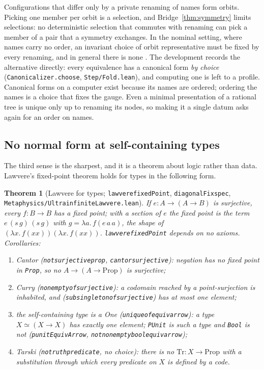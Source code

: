 \documentclass[]{article}
\newtheorem{theorem}{Theorem}
\theoremstyle{definition}
\theoremstyle{remark}
\newcommand{\codeus}{\textunderscore\allowbreak}
\newcommand{\code}[1]{\texttt{\let\_\codeus #1}}
\newcommand{\lpath}[1]{{\ttfamily\nolinkurl{#1}}}
\newcommand{\meta}[1]{\lpath{Metaphysics/#1.lean}}
\newcommand{\step}[1]{\lpath{Step/#1.lean}}
\begin{document}
Configurations that differ only by a private renaming of names form orbits. Picking one member per
orbit is a selection, and Bridge~\ref{thm:symmetry} limits selections: no deterministic selection
that commutes with renaming can pick a member of a pair that a symmetry exchanges. In the nominal
setting, where names carry no order, an invariant choice of orbit representative must be fixed by
every renaming, and in general there is none \cite{Pitts2013}. The development records the
alternative directly: every equivalence has a canonical form \emph{by choice}
(\code{Canonicalizer.choose}, \step{Fold}), and computing one is left to a profile. Canonical forms on
a computer exist because its names are ordered; ordering the names is a choice that fixes the gauge.
Even a minimal presentation of a rational tree is unique only up to renaming its nodes, so making it a
single datum asks again for an order on names.

\subsection{No normal form at self-containing types}
\label{sec:nf-types}

The third sense is the sharpest, and it is a theorem about logic rather than data. Lawvere's
fixed-point theorem \cite{Lawvere1969, Yanofsky2003} holds for types in the following form.

\begin{theorem}[Lawvere for types; \code{lawvere\_fixedPoint}, \code{diagonalFix\_spec}, \meta{UltrainfiniteLawvere}]
\label{thm:lawvere}
If $e:A\to(A\to B)$ is surjective, every $f:B\to B$ has a fixed point; with a section of $e$ the fixed
point is the term $e\,(s\,g)\,(s\,g)$ with $g=\lambda a.\,f(e\,a\,a)$, the shape of
$(\lambda x.\,f(xx))(\lambda x.\,f(xx))$. \code{lawvere\_fixedPoint} depends on no axioms. Corollaries:
\begin{enumerate}
\item \emph{Cantor} (\code{not\_surjective\_prop}, \code{cantor\_surjective}): negation has no fixed
  point in \code{Prop}, so no $A\to(A\to\mathrm{Prop})$ is surjective;
\item \emph{Curry} (\code{nonempty\_of\_surjective}): a codomain reached by a point-surjection is
  inhabited, and (\code{subsingleton\_of\_surjective}) has at most one element;
\item \emph{the self-containing type is a One} (\code{unique\_of\_equiv\_arrow}): a type
  $X\simeq(X\to X)$ has exactly one element; \code{PUnit} is such a type and \code{Bool} is not
  (\code{punitEquivArrow}, \code{not\_nonempty\_bool\_equiv\_arrow});
\item \emph{Tarski} (\code{no\_truth\_predicate}, no choice): there is no $\mathrm{Tr}:X\to\mathrm{Prop}$
  with a substitution through which every predicate on $X$ is defined by a code.
\end{enumerate}
\end{theorem}
\end{document}
